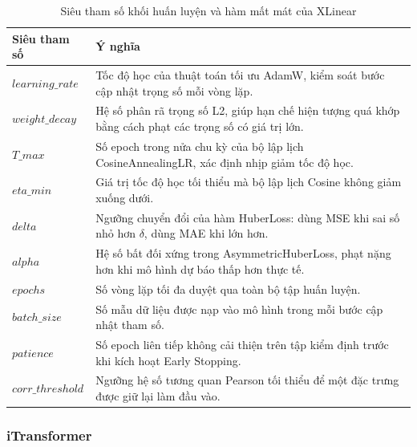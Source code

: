 \begin{table}[H]
\centering
\caption{Siêu tham số khối huấn luyện và hàm mất mát của XLinear}
\label{tab:xlinear_optim}
\renewcommand{\arraystretch}{1.3}
\begin{tabular}{p{3.8cm} p{10.5cm}}
\toprule
\textbf{Siêu tham số} & \textbf{Ý nghĩa} \\
\midrule
$learning\_rate$ & Tốc độ học của thuật toán tối ưu AdamW, kiểm soát bước cập nhật trọng số mỗi vòng lặp. \\
$weight\_decay$ & Hệ số phân rã trọng số L2, giúp hạn chế hiện tượng quá khớp bằng cách phạt các trọng số có giá trị lớn. \\
$T\_max$ & Số epoch trong nửa chu kỳ của bộ lập lịch CosineAnnealingLR, xác định nhịp giảm tốc độ học. \\
$eta\_min$ & Giá trị tốc độ học tối thiểu mà bộ lập lịch Cosine không giảm xuống dưới. \\
$delta$ & Ngưỡng chuyển đổi của hàm HuberLoss: dùng MSE khi sai số nhỏ hơn $\delta$, dùng MAE khi lớn hơn. \\
$alpha$ & Hệ số bất đối xứng trong AsymmetricHuberLoss, phạt nặng hơn khi mô hình dự báo thấp hơn thực tế. \\
$epochs$ & Số vòng lặp tối đa duyệt qua toàn bộ tập huấn luyện. \\
$batch\_size$ & Số mẫu dữ liệu được nạp vào mô hình trong mỗi bước cập nhật tham số. \\
$patience$ & Số epoch liên tiếp không cải thiện trên tập kiểm định trước khi kích hoạt Early Stopping. \\
$corr\_threshold$ & Ngưỡng hệ số tương quan Pearson tối thiểu để một đặc trưng được giữ lại làm đầu vào. \\
\bottomrule
\end{tabular}
\end{table}



\subsubsection{iTransformer}

